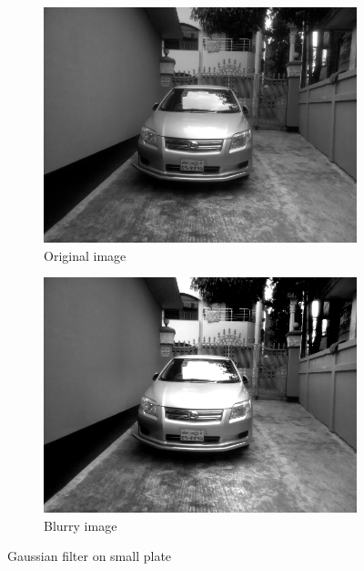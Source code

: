 \begin{figure}
\begin{subfigure}{0.5\textwidth}
    \centering
    \includegraphics[width=0.9\linewidth]{./img/experiment/stage.2/small}
    \caption{Original image}
\end{subfigure}
\begin{subfigure}{0.5\textwidth}
    \centering
    \includegraphics[width=0.9\linewidth]{./img/experiment/stage.5/small}
    \caption{Blurry image}
\end{subfigure}
\caption{Gaussian filter on small plate}
\label{fig:EnhanceResult3}
\end{figure}


